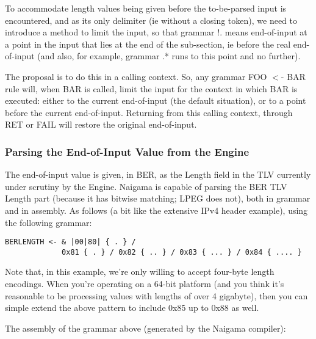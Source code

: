 To accommodate length values being given before the to-be-parsed input is 
encountered, and as its only delimiter (ie without a closing token), we 
need to introduce a method to limit the input, so that grammar !. means 
end-of-input at a point in the input that lies at the end of the 
sub-section, ie before the real end-of-input (and also, for example, 
grammar .* runs to this point and no further).

The proposal is to do this in a calling context. So, any grammar FOO $<$- 
BAR rule will, when BAR is called, limit the input for the context in 
which BAR is executed: either to the current end-of-input (the default 
situation), or to a point before the current end-of-input. Returning from 
this calling context, through RET or FAIL will restore the original 
end-of-input.

\subsubsection{Parsing the End-of-Input Value from the Engine}
\label{sec:work:tlv:eoi}

The end-of-input value is given, in BER, as the Length field in the TLV 
currently under scrutiny by the Engine. Naigama is capable of parsing the 
BER TLV Length part (because it has bitwise matching; LPEG does not), both 
in grammar and in assembly. As follows (a bit like the extensive IPv4 
header example), using the following grammar:

\begin{changemargin}{-60mm}{0mm}
\begin{myquote}
\begin{verbatim}
BERLENGTH <- & |00|80| { . } /
             0x81 { . } / 0x82 { .. } / 0x83 { ... } / 0x84 { .... }
\end{verbatim}
\end{myquote}
\end{changemargin}

Note that, in this example, we’re only willing to accept four-byte 
length encodings. When you’re operating on a 64-bit platform (and you 
think it’s reasonable to be processing values with lengths of over 4 
gigabyte), then you can simple extend the above pattern to include 0x85 
up to 0x88 as well.

The assembly of the grammar above (generated by the Naigama compiler):

